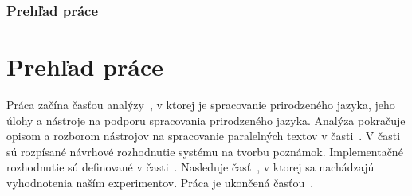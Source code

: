 {
	\subsection{Prehľad práce}
}
{
	\chapter{Prehľad práce}
}
Práca začína časťou analýzy~, v ktorej je spracovanie prirodzeného jazyka, jeho úlohy a nástroje na podporu spracovania prirodzeného jazyka. Analýza pokračuje opisom a rozborom nástrojov na spracovanie paralelných textov v časti~. V časti~ sú rozpísané návrhové rozhodnutie systému na tvorbu poznámok. Implementačné rozhodnutie sú definované v časti~. Nasleduje časť~, v ktorej sa nachádzajú vyhodnotenia naším experimentov. Práca je ukončená časťou~.
